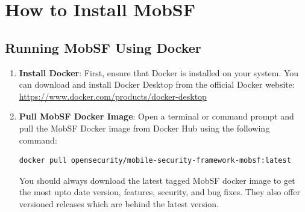 \documentclass{report}
\begin{document}
\chapter{How to Install MobSF}


\section{Running MobSF Using Docker}

\begin{enumerate}
    \item \textbf{Install Docker}: First, ensure that Docker is installed on your system. You can download and install Docker Desktop from the official Docker website: \href{https://www.docker.com/products/docker-desktop}{https://www.docker.com/products/docker-desktop}
    
    \item \textbf{Pull MobSF Docker Image}: Open a terminal or command prompt and pull the MobSF Docker image from Docker Hub using the following command:
    
    \begin{mdframed}[backgroundcolor=lightgray]
    \begin{BVerbatim}
docker pull opensecurity/mobile-security-framework-mobsf:latest
    \end{BVerbatim}
    \end{mdframed}
    You should always download the latest tagged MobSF docker image to get the most upto date version, features, security, and bug fixes. They also offer versioned releases which are behind the latest version.
    
   


\end{enumerate}
\end{document}
